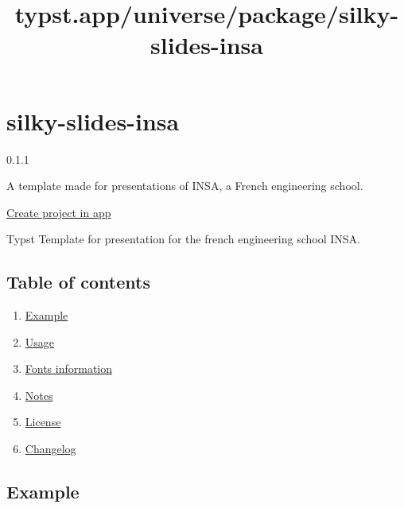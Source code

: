 \title{typst.app/universe/package/silky-slides-insa}

\label{banner}
\label{template-thumbnail}

\section{silky-slides-insa}\label{silky-slides-insa}

{ 0.1.1 }

A template made for presentations of INSA, a French engineering school.

\href{/app?template=silky-slides-insa&version=0.1.1}{Create project in
app}

\label{readme}

Typst Template for presentation for the french engineering school INSA.

\subsection{Table of contents}\label{table-of-contents}

\begin{enumerate}
\tightlist
\item
  \href{https://github.com/typst/packages/raw/main/packages/preview/silky-slides-insa/0.1.1/\#examples}{Example}
\item
  \href{https://github.com/typst/packages/raw/main/packages/preview/silky-slides-insa/0.1.1/\#usage}{Usage}
\item
  \href{https://github.com/typst/packages/raw/main/packages/preview/silky-slides-insa/0.1.1/\#fonts}{Fonts
  information}
\item
  \href{https://github.com/typst/packages/raw/main/packages/preview/silky-slides-insa/0.1.1/\#notes}{Notes}
\item
  \href{https://github.com/typst/packages/raw/main/packages/preview/silky-slides-insa/0.1.1/\#license}{License}
\item
  \href{https://github.com/typst/packages/raw/main/packages/preview/silky-slides-insa/0.1.1/\#changelog}{Changelog}
\end{enumerate}

\subsection{Example}\label{example}

